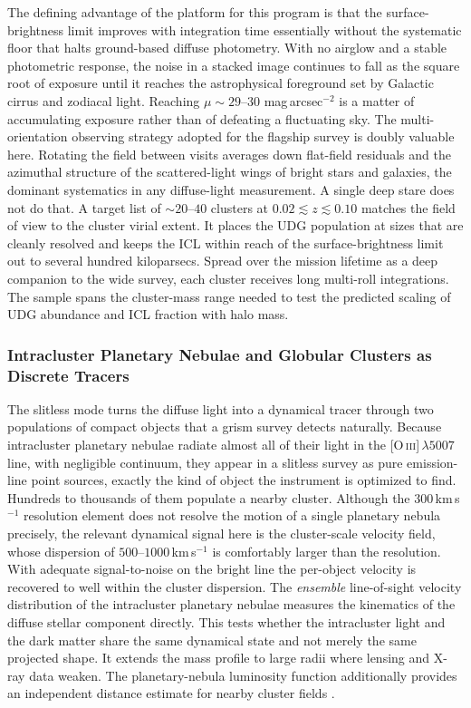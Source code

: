 The defining advantage of the platform for this program is that the surface-brightness limit improves with integration time essentially without the systematic floor that halts ground-based diffuse photometry. With no airglow and a stable photometric response, the noise in a stacked image continues to fall as the square root of exposure until it reaches the astrophysical foreground set by Galactic cirrus and zodiacal light. Reaching $\mu\sim29$--$30$ mag\,arcsec$^{-2}$ is a matter of accumulating exposure rather than of defeating a fluctuating sky. The multi-orientation observing strategy adopted for the flagship survey is doubly valuable here. Rotating the field between visits averages down flat-field residuals and the azimuthal structure of the scattered-light wings of bright stars and galaxies, the dominant systematics in any diffuse-light measurement. A single deep stare does not do that. A target list of $\sim20$--$40$ clusters at $0.02\lesssim z\lesssim0.10$ matches the field of view to the cluster virial extent. It places the UDG population at sizes that are cleanly resolved and keeps the ICL within reach of the surface-brightness limit out to several hundred kiloparsecs. Spread over the mission lifetime as a deep companion to the wide survey, each cluster receives long multi-roll integrations. The sample spans the cluster-mass range needed to test the predicted scaling of UDG abundance and ICL fraction with halo mass.

\subsubsection{Intracluster Planetary Nebulae and Globular Clusters as Discrete Tracers}

The slitless mode turns the diffuse light into a dynamical tracer through two populations of compact objects that a grism survey detects naturally. Because intracluster planetary nebulae radiate almost all of their light in the [O\,\textsc{iii}]\,$\lambda5007$ line, with negligible continuum, they appear in a slitless survey as pure emission-line point sources, exactly the kind of object the instrument is optimized to find. Hundreds to thousands of them populate a nearby cluster. Although the $300$\,km\,s$^{-1}$ resolution element does not resolve the motion of a single planetary nebula precisely, the relevant dynamical signal here is the cluster-scale velocity field, whose dispersion of $500$--$1000$\,km\,s$^{-1}$ is comfortably larger than the resolution. With adequate signal-to-noise on the bright line the per-object velocity is recovered to well within the cluster dispersion. The \emph{ensemble} line-of-sight velocity distribution of the intracluster planetary nebulae measures the kinematics of the diffuse stellar component directly. This tests whether the intracluster light and the dark matter share the same dynamical state and not merely the same projected shape. It extends the mass profile to large radii where lensing and X-ray data weaken. The planetary-nebula luminosity function additionally provides an independent distance estimate for nearby cluster fields \cite{ciardullo2012}.

